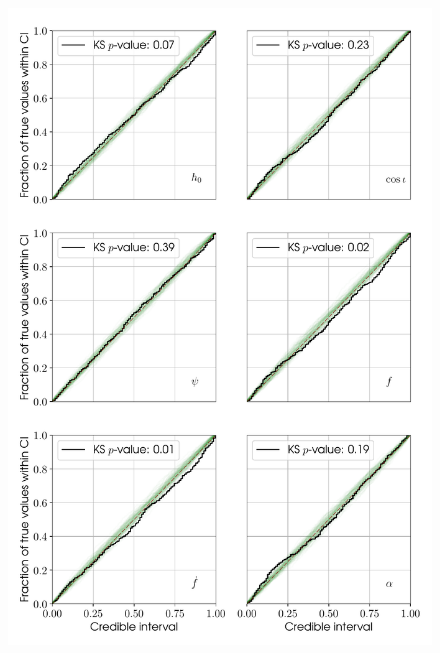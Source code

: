 \begin{figure}[!phtb]
\begin{center}
\includegraphics[width=1\columnwidth]{./figures/codeeval/stats/pp_extra/pp_plots_extra}
\caption{ \protect}
\end{center}
\end{figure}



